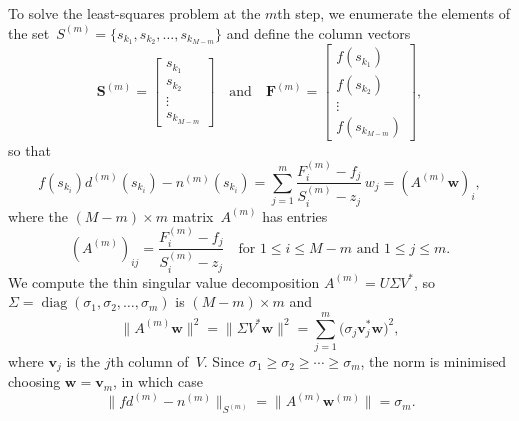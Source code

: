 \documentclass[12pt,a4paper]{article}
\newcommand{\diag}{\operatorname{diag}}
\begin{document}
To solve the least-squares problem at the $m$th step, we enumerate the elements 
of the set~$S^{(m)}=\{s_{k_1},s_{k_2},\ldots,s_{k_{M-m}}\}$ and 
define the column vectors
\[
\boldsymbol{S}^{(m)}=\begin{bmatrix}s_{k_1}\\ s_{k_2}\\ \vdots\\
s_{k_{M-m}}\end{bmatrix}
\quad\text{and}\quad
\boldsymbol{F}^{(m)}=\begin{bmatrix}f(s_{k_1})\\ f(s_{k_2})\\ 
\vdots\\ f(s_{k_{M-m}})\end{bmatrix},
\]
so that
\[
f(s_{k_i})d^{(m)}(s_{k_i})-n^{(m)}(s_{k_i})
    =\sum_{j=1}^m\frac{F^{(m)}_i-f_j}{S^{(m)}_i-z_j}\,w_j
    =(A^{(m)}\boldsymbol{w})_i,
\]
where the $(M-m)\times m$ matrix~$A^{(m)}$ has entries
\[
(A^{(m)})_{ij}=\frac{F^{(m)}_i-f_j}{S^{(m)}_i-z_j}
\quad\text{for $1\le i\le M-m$ and $1\le j\le m$.}
\]
We compute the thin singular value decomposition $A^{(m)}=U\Sigma V^*$,
so $\Sigma=\diag(\sigma_1,\sigma_2,\ldots,\sigma_m)$ is $(M-m)\times m$ and 
\[
\|A^{(m)}\boldsymbol{w}\|^2=\|\Sigma V^*\boldsymbol{w}\|^2
    =\sum_{j=1}^m\bigl(\sigma_j\boldsymbol{v}_j^*\boldsymbol{w}\bigr)^2,
\]
where $\boldsymbol{v}_j$ is the $j$th column of~$V$.  Since
$\sigma_1\ge\sigma_2\ge\cdots\ge\sigma_m$, the norm is minimised choosing
$\boldsymbol{w}=\boldsymbol{v}_m$, in which case
\[
\|fd^{(m)}-n^{(m)}\|_{S^{(m)}}=\|A^{(m)}\boldsymbol{w}^{(m)}\|=\sigma_m.
\]






\printbibliography
\end{document}
